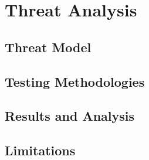 \chapter{Threat Analysis}
\label{cha:ta}

\section{Threat Model}
\label{sec:ta_model}

\section{Testing Methodologies}
\label{sec:ta_methodologies}

\section{Results and Analysis}
\label{sec:ta_analysis}

\section{Limitations}
\label{sec:ta_limitations}